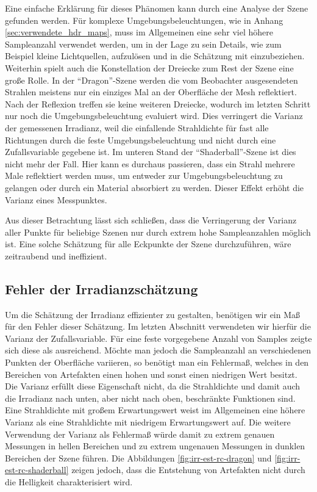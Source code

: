 		Eine einfache Erklärung für dieses Phänomen kann durch eine Analyse der Szene gefunden werden.
		Für komplexe Umgebungsbeleuchtungen, wie in Anhang \ref{sec:verwendete_hdr_maps}, muss im Allgemeinen eine sehr viel höhere Sampleanzahl verwendet werden, um in der Lage zu sein Details, wie zum Beispiel kleine Lichtquellen, aufzulösen und in die Schätzung mit einzubeziehen.
		Weiterhin spielt auch die Konstellation der Dreiecke zum Rest der Szene eine große Rolle.
		In der \enquote{Dragon}-Szene werden die vom Beobachter ausgesendeten Strahlen meistens nur ein einziges Mal an der Oberfläche der Mesh reflektiert.
		Nach der Reflexion treffen sie keine weiteren Dreiecke, wodurch im letzten Schritt nur noch die Umgebungsbeleuchtung evaluiert wird.
		Dies verringert die Varianz der gemessenen Irradianz, weil die einfallende Strahldichte für fast alle Richtungen durch die feste Umgebungsbeleuchtung und nicht durch eine Zufallsvariable gegebene ist.
		Im unteren Stand der \enquote{Shaderball}-Szene ist dies nicht mehr der Fall.
		Hier kann es durchaus passieren, dass ein Strahl mehrere Male reflektiert werden muss, um entweder zur Umgebungsbeleuchtung zu gelangen oder durch ein Material absorbiert zu werden.
		Dieser Effekt erhöht die Varianz eines Messpunktes.

		Aus dieser Betrachtung lässt sich schließen, dass die Verringerung der Varianz aller Punkte für beliebige Szenen nur durch extrem hohe Sampleanzahlen möglich ist.
		Eine solche Schätzung für alle Eckpunkte der Szene durchzuführen, wäre zeitraubend und ineffizient.


	\subsection{Fehler der Irradianzschätzung} %
	\label{sub:fehler_der_irradianzschaetzung}

		Um die Schätzung der Irradianz effizienter zu gestalten, benötigen wir ein Maß für den Fehler dieser Schätzung.
		Im letzten Abschnitt verwendeten wir hierfür die Varianz der Zufallsvariable.
		Für eine feste vorgegebene Anzahl von Samples zeigte sich diese als ausreichend.
		Möchte man jedoch die Sampleanzahl an verschiedenen Punkten der Oberfläche variieren, so benötigt man ein Fehlermaß, welches in den Bereichen von Artefakten einen hohen und sonst einen niedrigen Wert besitzt.
		Die Varianz erfüllt diese Eigenschaft nicht, da die Strahldichte und damit auch die Irradianz nach unten, aber nicht nach oben, beschränkte Funktionen sind.
		Eine Strahldichte mit großem Erwartungswert weist im Allgemeinen eine höhere Varianz als eine Strahldichte mit niedrigem Erwartungswert auf.
		Die weitere Verwendung der Varianz als Fehlermaß würde damit zu extrem genauen Messungen in hellen Bereichen und zu extrem ungenauen Messungen in dunklen Bereichen der Szene führen.
		Die Abbildungen \ref{fig:irr-est-rc-dragon} und \ref{fig:irr-est-rc-shaderball} zeigen jedoch, dass die Entstehung von Artefakten nicht durch die Helligkeit charakterisiert wird.

